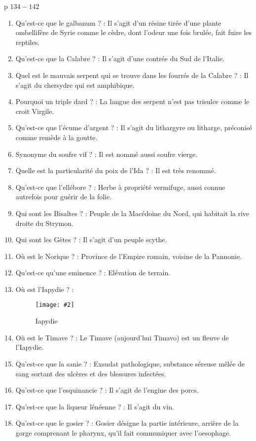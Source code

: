 \documentclass[a4paper, 11pt, hidelinks]{article}
\newcommand{\img}[4]{\begin{figure}[!ht]
    \centering
    \texttt{[image: \#2]}
    \caption{#3}
    \label{#4}
    \end{figure} }
\begin{document}
p $134 - 142$

\begin{enumerate}
      \item Qu'est-ce que le galbanum ? : Il s'agit d'un résine tirée d'une plante ombellifère de Syrie comme le cèdre,
            dont l'odeur une fois brulée, fait fuire les reptiles.
      \item Qu'est-ce que la Calabre ? : Il s'agit d'une contrée du Sud de l'Italie.
      \item Quel est le mauvais serpent qui se trouve dans les fourrés de la Calabre ? : Il s'agit du chersydre qui est
            amphibique.
      \item Pourquoi un triple dard ? : La langue des serpent n'est pas trisulce comme le croit Virgile.
      \item Qu'est-ce que l'écume d'argent ? : Il s'agit du lithargyre ou litharge, préconisé comme remède à la goutte.
      \item Synonyme du soufre vif ? : Il est nommé aussi soufre vierge.
      \item Quelle est la particularité du poix de l'Ida ? : Il est très renommé.
      \item Qu'est-ce que l'ellébore ? : Herbe à propriété vermifuge, aussi connue autrefois pour guérir de la folie.
      \item Qui sont les Bisaltes ? : Peuple de la Macédoine du Nord, qui habitait la rive droite du Strymon.
      \item Qui sont les Gètes ? : Il s'agit d'un peuple scythe.
      \item Où est le Norique ? : Province de l'Empire romain, voisine de la Pannonie.
      \item Qu'est-ce qu'une eminence ? : Elévation de terrain.
      \item Où est l'Iapydie ? : 
            \img{0.3}{Iapydie.png}{Iapydie}{130}
      \item Où est le Timave ? : Le Timave (aujourd'hui Timavo) est un fleuve de l'Iapydie.
      \item Qu'est-ce que la sanie ? : Exsudat pathologique, substance séreuse mêlée de sang sortant des ulcères et des blessures infectées.
      \item Qu'est-ce que l'esquinancie ? : Il s'agit de l'engine des porcs.
      \item Qu'est-ce que la liqueur lénéenne ? : Il s'agit du vin.
      \item Qu'est-ce que le gosier ? : Gosier désigne la partie intérieure, arrière de la gorge comprenant le pharynx, qu'il fait communiquer avec l'oesophage.

\end{enumerate}
\end{document}
